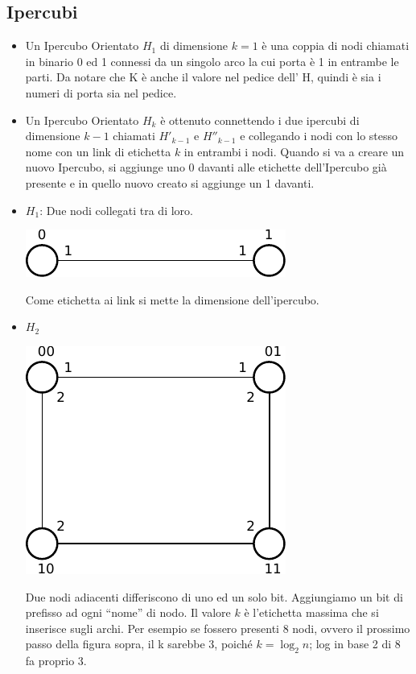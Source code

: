 \subsection{Ipercubi}
\begin{itemize}
    \item Un Ipercubo Orientato $H_1$ di dimensione $k=1$ è una coppia di nodi
          chiamati in binario 0 ed 1 connessi da un singolo arco la cui porta è 1 in
          entrambe le parti. Da notare che K è anche il valore nel pedice dell' H,
          quindi è sia i numeri di porta sia nel pedice.
    \item Un Ipercubo Orientato $H_k$ è ottenuto connettendo i due ipercubi di
          dimensione $k-1$ chiamati $H'_{k-1}$ e $H''_{k-1}$ e collegando i nodi con lo
          stesso nome con un link di etichetta $k$ in entrambi i nodi. Quando si va a
          creare un nuovo Ipercubo, si aggiunge uno 0 davanti alle etichette
          dell'Ipercubo già presente e in quello nuovo creato si aggiunge un 1 davanti.
\end{itemize}

\begin{itemize}
    \item $H_1$: Due nodi collegati tra di loro.
          \begin{center}
              \includegraphics[scale=0.8]{capitoli/broadcast/imgs/n_10}
          \end{center}
          Come etichetta ai link si mette la dimensione dell'ipercubo.

    \item $H_2$
          \begin{center}
              \includegraphics[scale=0.8]{capitoli/broadcast/imgs/n_11}
          \end{center}
          Due nodi adiacenti differiscono di uno ed un solo bit. Aggiungiamo un
          bit di prefisso ad ogni ``nome'' di nodo. Il valore $k$ è l'etichetta
          massima che si inserisce sugli archi. Per esempio se fossero presenti 8
          nodi, ovvero il prossimo passo della figura sopra, il k sarebbe 3,
          poiché $k = \log_2{n}$; log in base 2 di 8 fa proprio 3.
\end{itemize}

